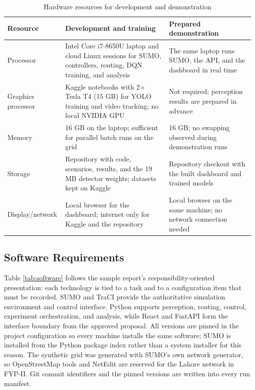 \begin{table}[htbp]
\centering
\caption{Hardware resources for development and demonstration}
\label{tab:hardware}
\begin{tabularx}{\textwidth}{p{}YY}
\toprule
\textbf{Resource} & \textbf{Development and training} & \textbf{Prepared demonstration}\\
\midrule
Processor & Intel Core i7-8650U laptop and cloud Linux sessions for SUMO, controllers, routing, DQN training, and analysis & The same laptop runs SUMO, the API, and the dashboard in real time\\
Graphics processor & Kaggle notebooks with 2$\times$ Tesla T4 (15 GB) for YOLO training and video tracking; no local NVIDIA GPU & Not required; perception results are prepared in advance\\
Memory & 16 GB on the laptop; sufficient for parallel batch runs on the grid & 16 GB; no swapping observed during demonstration runs\\
Storage & Repository with code, scenarios, results, and the 19 MB detector weights; datasets kept on Kaggle & Repository checkout with the built dashboard and trained models\\
Display/network & Local browser for the dashboard; internet only for Kaggle and the repository & Local browser on the same machine; no network connection needed\\
\bottomrule
\end{tabularx}
\end{table}

\subsection{Software Requirements}

Table \ref{tab:software} follows the sample report's responsibility-oriented presentation: each technology is tied to a task and to a configuration item that must be recorded. SUMO and TraCI provide the authoritative simulation environment and control interface. Python supports perception, routing, control, experiment orchestration, and analysis, while React and FastAPI form the interface boundary from the approved proposal. All versions are pinned in the project configuration so every machine installs the same software; SUMO is installed from the Python package index rather than a system installer for this reason. The synthetic grid was generated with SUMO's own network generator, so OpenStreetMap tools and NetEdit are reserved for the Lahore network in FYP-II. Git commit identifiers and the pinned versions are written into every run manifest.


